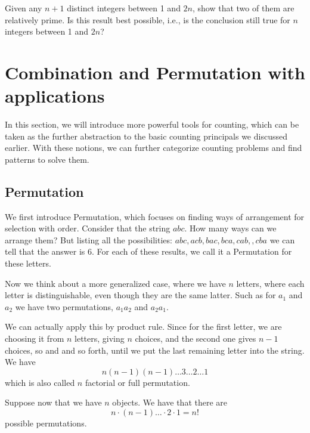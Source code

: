     \begin{exercise}
        Given any \( n + 1 \) distinct integers between 1 and \( 2n \), show that two of them are relatively prime. Is this result best possible, i.e., is the conclusion still true for \( n \) integers between 1 and \( 2n \)?
    \end{exercise}
    
    
    \section{Combination and Permutation with applications}
    In this section, we will introduce more powerful tools for counting, which
    can be taken as the further abstraction to the basic counting principals we discussed
    earlier. With these notions, we can further categorize counting problems and find
    patterns to solve them.
        \subsection{Permutation}
        We first introduce Permutation, which focuses on finding ways of arrangement
        for selection with order. Consider that the string $abc$. How many ways can we 
        arrange them? But listing all the possibilities: $abc, acb, bac, bca, cab,
        ,cba$ we can tell that the answer is 6. For each of these results, we call it 
        a Permutation for these letters.

        Now we think about a more generalized case, where we have $n$ letters, where 
        each letter is distinguishable, even though they are the same latter. Such as 
        for $a_1$ and $a_2$ we have two permutations, $a_1a_2$ and $a_2a_1$.
    
        We can actually apply this by product rule. Since for the first letter, we 
        are choosing it from $n$ letters, giving $n$ choices, and the second one gives
        $n-1$ choices, so and and so forth, until we put the last remaining letter into
        the string. We have 
        $$n(n-1)(n-1)\dots 3\dots 2 \dots 1$$
        which is also called $n$ factorial or full permutation.
        \begin{definition}\label{FP}
            Suppose now that we have $n$ objects. We have that there are $$n\cdot (n-1)\dots \cdot2 \cdot 1 = n!$$
            possible permutations.
        \end{definition}

